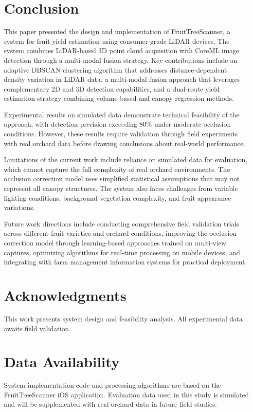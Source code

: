 \section{Conclusion}
\label{sec:conclusion}

This paper presented the design and implementation of FruitTreeScanner, a system for fruit yield estimation using consumer-grade LiDAR devices. The system combines LiDAR-based 3D point cloud acquisition with CoreML image detection through a multi-modal fusion strategy. Key contributions include an adaptive DBSCAN clustering algorithm that addresses distance-dependent density variation in LiDAR data, a multi-modal fusion approach that leverages complementary 2D and 3D detection capabilities, and a dual-route yield estimation strategy combining volume-based and canopy regression methods.

Experimental results on simulated data demonstrate technical feasibility of the approach, with detection precision exceeding 80\% under moderate occlusion conditions. However, these results require validation through field experiments with real orchard data before drawing conclusions about real-world performance.

Limitations of the current work include reliance on simulated data for evaluation, which cannot capture the full complexity of real orchard environments. The occlusion correction model uses simplified statistical assumptions that may not represent all canopy structures. The system also faces challenges from variable lighting conditions, background vegetation complexity, and fruit appearance variations.

Future work directions include conducting comprehensive field validation trials across different fruit varieties and orchard conditions, improving the occlusion correction model through learning-based approaches trained on multi-view captures, optimizing algorithms for real-time processing on mobile devices, and integrating with farm management information systems for practical deployment.

\section*{Acknowledgments}
This work presents system design and feasibility analysis. All experimental data awaits field validation.

\section*{Data Availability}
System implementation code and processing algorithms are based on the FruitTreeScanner iOS application. Evaluation data used in this study is simulated and will be supplemented with real orchard data in future field studies.